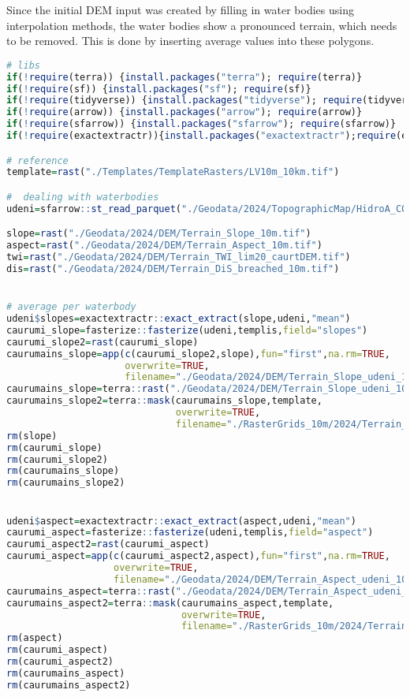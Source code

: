 \documentclass[
]{book}
\begin{document}
Since the initial DEM input was created by filling in water bodies using
interpolation methods, the water bodies show a pronounced terrain, which needs
to be removed. This is done by inserting average values into these polygons.

\begin{lstlisting}[language=R]
# libs
if(!require(terra)) {install.packages("terra"); require(terra)}
if(!require(sf)) {install.packages("sf"); require(sf)}
if(!require(tidyverse)) {install.packages("tidyverse"); require(tidyverse)}
if(!require(arrow)) {install.packages("arrow"); require(arrow)}
if(!require(sfarrow)) {install.packages("sfarrow"); require(sfarrow)}
if(!require(exactextractr)){install.packages("exactextractr");require(exactextractr)}

# reference
template=rast("./Templates/TemplateRasters/LV10m_10km.tif")

#  dealing with waterbodies 
udeni=sfarrow::st_read_parquet("./Geodata/2024/TopographicMap/HidroA_COMB.parquet")

slope=rast("./Geodata/2024/DEM/Terrain_Slope_10m.tif")
aspect=rast("./Geodata/2024/DEM/Terrain_Aspect_10m.tif")
twi=rast("./Geodata/2024/DEM/Terrain_TWI_lim20_caurtDEM.tif")
dis=rast("./Geodata/2024/DEM/Terrain_DiS_breached_10m.tif")


# average per waterbody
udeni$slopes=exactextractr::exact_extract(slope,udeni,"mean")
caurumi_slope=fasterize::fasterize(udeni,templis,field="slopes")
caurumi_slope2=rast(caurumi_slope)
caurumains_slope=app(c(caurumi_slope2,slope),fun="first",na.rm=TRUE,
                     overwrite=TRUE,
                     filename="./Geodata/2024/DEM/Terrain_Slope_udeni_10m.tif")
caurumains_slope=terra::rast("./Geodata/2024/DEM/Terrain_Slope_udeni_10m.tif")
caurumains_slope2=terra::mask(caurumains_slope,template,
                              overwrite=TRUE,
                              filename="./RasterGrids_10m/2024/Terrain_Slope_udeni2_10m.tif")
rm(slope)
rm(caurumi_slope)
rm(caurumi_slope2)
rm(caurumains_slope)
rm(caurumains_slope2)


udeni$aspect=exactextractr::exact_extract(aspect,udeni,"mean")
caurumi_aspect=fasterize::fasterize(udeni,templis,field="aspect")
caurumi_aspect2=rast(caurumi_aspect)
caurumi_aspect=app(c(caurumi_aspect2,aspect),fun="first",na.rm=TRUE,
                   overwrite=TRUE,
                   filename="./Geodata/2024/DEM/Terrain_Aspect_udeni_10m.tif")
caurumains_aspect=terra::rast("./Geodata/2024/DEM/Terrain_Aspect_udeni_10m.tif")
caurumains_aspect2=terra::mask(caurumains_aspect,template,
                               overwrite=TRUE,
                               filename="./RasterGrids_10m/2024/Terrain_Aspect_udeni2_10m.tif")
rm(aspect)
rm(caurumi_aspect)
rm(caurumi_aspect2)
rm(caurumains_aspect)
rm(caurumains_aspect2)




\end{lstlisting}
\end{document}
